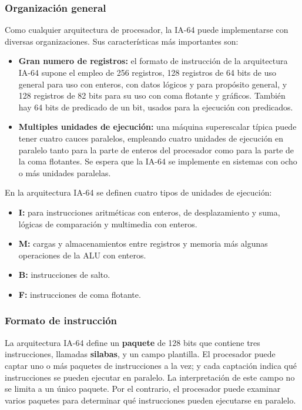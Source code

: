 \subsubsection{Organización general}

Como cualquier arquitectura de procesador, la IA-64 puede implementarse con diversas organizaciones. Sus características más importantes son:

\begin{itemize}
  \item \textbf{Gran numero de registros:} el formato de instrucción de la arquitectura IA-64 supone el empleo de 256 registros, 128 registros de 64 bits de uso general para uso con enteros, con datos lógicos y para propósito general, y 128 registros de 82 bits para su uso con coma flotante y gráficos. También hay 64 bits de predicado de un bit, usados para la ejecución con predicados.
  \item \textbf{Multiples unidades de ejecución:} una máquina superescalar típica puede tener cuatro cauces paralelos, empleando cuatro unidades de ejecución en paralelo tanto para la parte de enteros del procesador como para la parte de la coma flotantes. Se espera que la IA-64 se implemente en sistemas con ocho o más unidades paralelas.
\end{itemize}

En la arquitectura IA-64 se definen cuatro tipos de unidades de ejecución:

\begin{itemize}
  \item \textbf{I:} para instrucciones aritméticas con enteros, de desplazamiento y suma, lógicas de comparación y multimedia con enteros.
  \item \textbf{M:} cargas y almacenamientos entre registros y memoria más algunas operaciones de la ALU con enteros.
  \item \textbf{B:} instrucciones de salto.
  \item \textbf{F:} instrucciones de coma flotante.
\end{itemize}

\subsubsection*{Formato de instrucción}

La arquitectura IA-64 define un \textbf{paquete} de 128 bits que contiene tres instrucciones, llamadas \textbf{silabas}, y un campo plantilla. El procesador puede captar uno o más paquetes de instrucciones a la vez; y cada captación indica qué instrucciones se pueden ejecutar en paralelo. La interpretación de este campo no se limita a un único paquete. Por el contrario, el procesador puede examinar varios paquetes para determinar qué instrucciones pueden ejecutarse en paralelo.

